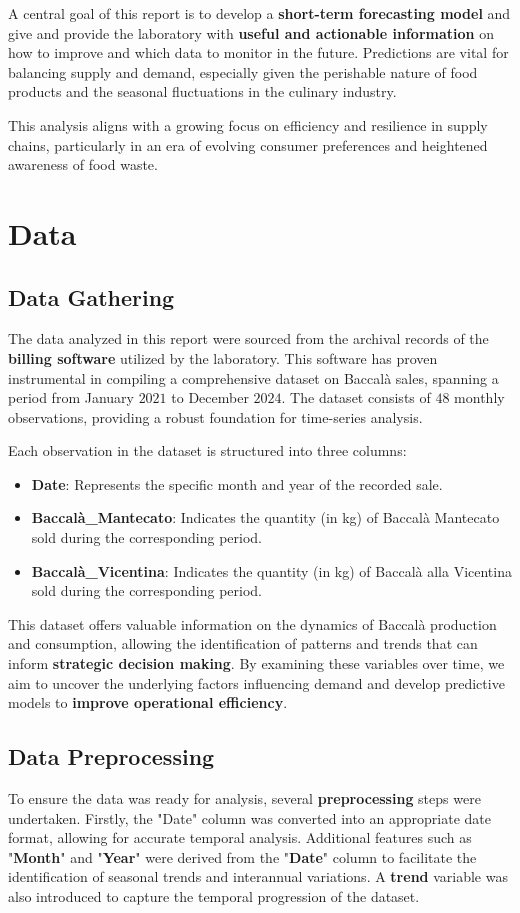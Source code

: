\documentclass[10pt,twocolumn,letterpaper]{article}
\begin{document}
A central goal of this report is to develop a \textbf{short-term forecasting model} and give and provide the laboratory with \textbf{useful and actionable information} on how to improve and which data to monitor in the future. Predictions are vital for balancing supply and demand, especially given the perishable nature of food products and the seasonal fluctuations in the culinary industry.

This analysis aligns with a growing focus on efficiency and resilience in supply chains, particularly in an era of evolving consumer preferences and heightened awareness of food waste.

\section{Data}
\subsection{Data Gathering}
The data analyzed in this report were sourced from the archival records of the \textbf{billing software} utilized by the laboratory. This software has proven instrumental in compiling a comprehensive dataset on Baccalà sales, spanning a period from January $2021$ to December $2024$. The dataset consists of $48$ monthly observations, providing a robust foundation for time-series analysis.

Each observation in the dataset is structured into three columns:
\begin{itemize}
    \item \textbf{Date}: Represents the specific month and year of the recorded sale.
    \item \textbf{Baccalà\_Mantecato}: Indicates the quantity (in kg) of Baccalà Mantecato sold during the corresponding period.
    \item \textbf{Baccalà\_Vicentina}: Indicates the quantity (in kg) of Baccalà alla Vicentina sold during the corresponding period.
\end{itemize}


This dataset offers valuable information on the dynamics of Baccalà production and consumption, allowing the identification of patterns and trends that can inform \textbf{strategic decision making}. By examining these variables over time, we aim to uncover the underlying factors influencing demand and develop predictive models to \textbf{improve operational efficiency}.

\subsection{Data Preprocessing}
To ensure the data was ready for analysis, several \textbf{preprocessing} steps were undertaken. Firstly, the "Date" column was converted into an appropriate date format, allowing for accurate temporal analysis. Additional features such as "\textbf{Month}" and "\textbf{Year}" were derived from the "\textbf{Date}" column to facilitate the identification of seasonal trends and interannual variations. A \textbf{trend} variable was also introduced to capture the temporal progression of the dataset.
\end{document}
